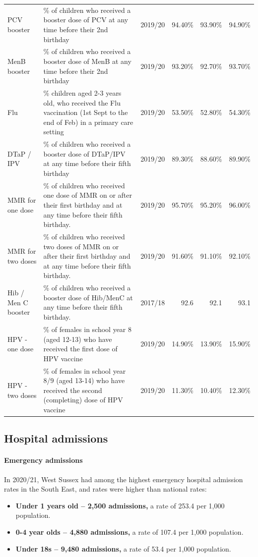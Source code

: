\begin{table}[hbt]
\begin{tabular}{llrrrr}
    PCV booster & \% of children who received a booster dose of PCV at any time before their 2nd birthday & 2019/20 & 94.40\% & 93.90\% & 94.90\% \\
    MenB booster & \% of children who received a booster dose of MenB at any time before their 2nd birthday & 2019/20 & 93.20\% & 92.70\% & 93.70\% \\
    Flu & \% children aged 2-3 years old, who received the Flu vaccination (1st Sept to the end of Feb) in a primary care setting & 2019/20 & 53.50\% & 52.80\% & 54.30\% \\
    DTaP / IPV & \% of children who received a booster dose of DTaP/IPV at any time before their fifth birthday & 2019/20 & 89.30\% & 88.60\% & 89.90\% \\
    MMR for one dose & \% of children who received one dose of MMR on or after their first birthday and at any time before their fifth birthday. & 2019/20 & 95.70\% & 95.20\% & 96.00\% \\
    MMR for two doses & \% of children who received two doses of MMR on or after their first birthday and at any time before their fifth birthday. &  2019/20 & 91.60\% & 91.10\% & 92.10\% \\
    Hib / Men C booster & \% of children who received a booster dose of Hib/MenC at any time before their fifth birthday. & 2017/18 & 92.6 & 92.1 & 93.1 \\
    HPV - one dose & \% of females in school year 8 (aged 12-13) who have received the first dose of HPV vaccine & 2019/20 & 14.90\% & 13.90\% & 15.90\% \\
    HPV - two doses & \% of females in school year 8/9 (aged 13-14) who have received the second (completing) dose of HPV vaccine & 2019/20 & 11.30\% &10.40\% & 12.30\% \\
    \bottomrule
\end{tabular}
\label{tab:childhoodimms}
\end{table}
\normalsize
\newpage
\subsection{Hospital admissions}
\paragraph{Emergency admissions}In 2020/21, West Sussex had among the highest emergency hospital admission rates in the South East, and rates were higher than national rates:
\begin{itemize}[noitemsep]
    \item {\bfseries Under 1 years old -- 2,500 admissions,} a rate of 253.4 per 1,000 population.
    \item {\bfseries 0-4 year olds -- 4,880 admissions,} a rate of 107.4 per 1,000 population.
    \item {\bfseries Under 18s -- 9,480 admissions,} a rate of 53.4 per 1,000 population.
\end{itemize}
